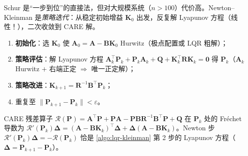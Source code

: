 Schur 是“一步到位”的直接法，但对大规模系统（$n>100$）代价高。Newton--Kleinman 是\emph{策略迭代}：从稳定初始增益 $\mathbf K_0$ 出发，反复解 Lyapunov 方程（线性！），二次收敛到 CARE 解\cite{kleinman1968iterative}。

\begin{algo}\label{algo:lqr-kleinman}
\begin{enumerate}
  \item \textbf{初始化}：选 $\mathbf K_0$ 使 $\mathbf A_0=\mathbf A-\mathbf B\mathbf K_0$ Hurwitz（极点配置或 LQR 粗解）；
  \item \textbf{策略评估}：解 Lyapunov 方程 $\mathbf A_k^\top\mathbf P_k+\mathbf P_k\mathbf A_k+\mathbf Q+\mathbf K_k^\top\mathbf R\mathbf K_k=\mathbf0$ 得 $\mathbf P_k$（$\mathbf A_k$ Hurwitz $+$ 右端正定 $\Rightarrow$ 唯一正定解）；
  \item \textbf{策略改进}：$\mathbf K_{k+1}=\mathbf R^{-1}\mathbf B^\top\mathbf P_k$；
  \item 重复至 $\|\mathbf P_{k+1}-\mathbf P_k\|<\varepsilon$。
\end{enumerate}
\end{algo}

\begin{proposition}[Kleinman 迭代 $=$ Riccati 算子的 Newton 法]\label{prop:lqr-kleinman-newton}
CARE 残差算子 $\mathcal R(\mathbf P)=\mathbf A^\top\mathbf P+\mathbf P\mathbf A-\mathbf P\mathbf B\mathbf R^{-1}\mathbf B^\top\mathbf P+\mathbf Q$ 在 $\mathbf P_k$ 处的 Fréchet 导数为 $\mathcal R'(\mathbf P_k)\boldsymbol\Delta=(\mathbf A-\mathbf B\mathbf K_k)^\top\boldsymbol\Delta+\boldsymbol\Delta(\mathbf A-\mathbf B\mathbf K_k)$。Newton 步 $\mathcal R'(\mathbf P_k)\boldsymbol\Delta=-\mathcal R(\mathbf P_k)$ 恰是 \cref{algo:lqr-kleinman} 第 2 步的 Lyapunov 方程（$\boldsymbol\Delta=\mathbf P_{k+1}-\mathbf P_k$）。
\end{proposition}

